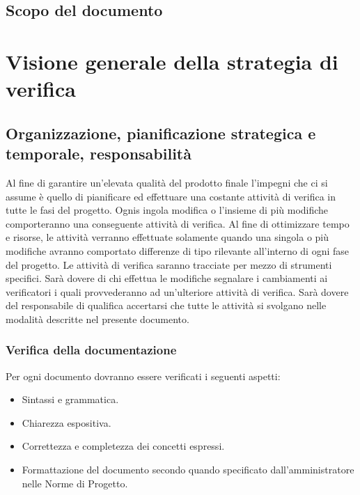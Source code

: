 \section{Scopo del documento}





\chapter{Visione generale della strategia di verifica}
\thispagestyle{fancy} %

\section{Organizzazione, pianificazione strategica e temporale, responsabilit\`a}

Al fine di garantire un'elevata qualit\`a del prodotto finale l'impegni che ci si
assume \`e quello di pianificare ed effettuare una costante attivit\`a di
verifica in tutte le fasi del progetto. Ognis ingola modifica o l'insieme di
pi\`u modifiche comporteranno una conseguente attivit\`a di verifica. Al fine di
ottimizzare tempo e risorse, le attivit\`a verranno effettuate solamente quando
una singola o pi\`u modifiche avranno comportato differenze di tipo rilevante
all'interno di ogni fase del progetto. Le attivit\`a di verifica saranno
tracciate per mezzo di strumenti specifici. Sar\`a dovere di chi effettua le
modifiche segnalare i cambiamenti ai verificatori i quali provvederanno ad
un'ulteriore attivit\`a di verifica. Sar\`a dovere del responsabile di qualifica
accertarsi che tutte le attivit\`a si svolgano nelle modalit\`a descritte nel presente documento.

\subsection{Verifica della documentazione}

Per ogni documento dovranno essere verificati i seguenti aspetti:
\begin{itemize}
\item Sintassi e grammatica.
\item Chiarezza espositiva.
\item Correttezza e completezza dei concetti espressi.
\item Formattazione del documento secondo quando specificato dall'amministratore
nelle Norme di Progetto.
\end{itemize}

